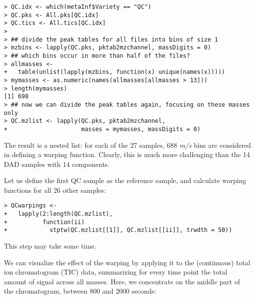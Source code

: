 \documentclass[a4paper,11pt]{article}\usepackage[]{graphicx}\usepackage[]{color}
\makeatletter
\newenvironment{kframe}{%
 \def\at@end@of@kframe{}%
 \ifinner\ifhmode%
  \def\at@end@of@kframe{\end{minipage}}%
  \begin{minipage}{\columnwidth}%
 \fi\fi%
 \def\FrameCommand##1{\hskip\@totalleftmargin \hskip-\fboxsep
 \colorbox{shadecolor}{##1}\hskip-\fboxsep
     \hskip-\linewidth \hskip-\@totalleftmargin \hskip\columnwidth}%
 \MakeFramed {\advance\hsize-\width
   \@totalleftmargin\z@ \linewidth\hsize
   \@setminipage}}%
 {\par\unskip\endMakeFramed%
 \at@end@of@kframe}
\newenvironment{knitrout}{}{} %
\makeatother
\begin{document}
\begin{knitrout}\small
{}\color{fgcolor}\begin{kframe}
\begin{verbatim}
> QC.idx <- which(metaInf$Variety == "QC")
> QC.pks <- All.pks[QC.idx]
> QC.tics <- All.tics[QC.idx]
> 
> ## divide the peak tables for all files into bins of size 1
> mzbins <- lapply(QC.pks, pktab2mzchannel, massDigits = 0)
> ## which bins occur in more than half of the files?
> allmasses <- 
+   table(unlist(lapply(mzbins, function(x) unique(names(x)))))
> mymasses <- as.numeric(names(allmasses[allmasses > 13]))
> length(mymasses)
[1] 698
> ## now we can divide the peak tables again, focusing on these masses only 
> QC.mzlist <- lapply(QC.pks, pktab2mzchannel, 
+                     masses = mymasses, massDigits = 0)
\end{verbatim}
\end{kframe}
\end{knitrout}

\noindent
The result is a nested list: for each of the 27 samples, 688
\emph{m/z} bins are considered in defining a warping
function. Clearly, this is much more challenging than the 14 DAD
samples with 14 components.

Let us define the first QC sample as the reference sample, and
calculate warping functions for all 26 other samples:

\begin{knitrout}\small
{}\color{fgcolor}\begin{kframe}
\begin{verbatim}
> QCwarpings <-
+   lapply(2:length(QC.mzlist),
+          function(ii)
+            stptw(QC.mzlist[[1]], QC.mzlist[[ii]], trwdth = 50))
\end{verbatim}
\end{kframe}
\end{knitrout}

\noindent
This step may take some time.

We can visualize the effect of the warping by applying it to the
(continuous) total ion chromatogram (TIC) data, summarizing for
every time point the total amount of signal across all masses. Here,
we concentrate on the middle part of the chromatogram, between 800 and
2000 seconds:
\end{document}
